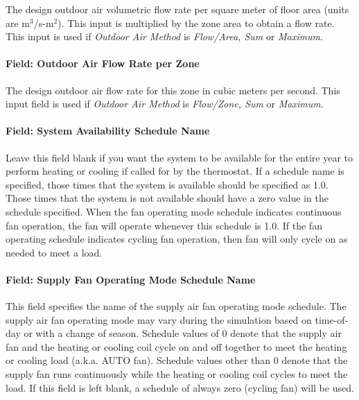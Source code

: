 The design outdoor air volumetric flow rate per square meter of floor area (units are m\(^{3}\)/s-m\(^{2}\)). This input is multiplied by the zone area to obtain a flow rate. This input is used if \emph{Outdoor Air Method} is \emph{Flow/Area, Sum} or \emph{Maximum}.

\paragraph{Field: Outdoor Air Flow Rate per Zone}\label{field-outdoor-air-flow-rate-per-zone-3}

The design outdoor air flow rate for this zone in cubic meters per second. This input field is used if \emph{Outdoor Air Method} is \emph{Flow/Zone, Sum} or \emph{Maximum}.

\paragraph{Field: System Availability Schedule Name}\label{field-system-availability-schedule-name-2}

Leave this field blank if you want the system to be available for the entire year to perform heating or cooling if called for by the thermostat. If a schedule name is specified, those times that the system is available should be specified as 1.0. Those times that the system is not available should have a zero value in the schedule specified. When the fan operating mode schedule indicates continuous fan operation, the fan will operate whenever this schedule is 1.0. If the fan operating schedule indicates cycling fan operation, then fan will only cycle on as needed to meet a load.

\paragraph{Field: Supply Fan Operating Mode Schedule Name}\label{field-supply-fan-operating-mode-schedule-name}

This field specifies the name of the supply air fan operating mode schedule. The supply air fan operating mode may vary during the simulation based on time-of-day or with a change of season. Schedule values of 0 denote that the supply air fan and the heating or cooling coil cycle on and off together to meet the heating or cooling load (a.k.a. AUTO fan). Schedule values other than 0 denote that the supply fan runs continuously while the heating or cooling coil cycles to meet the load. If this field is left blank, a schedule of always zero (cycling fan) will be used.

